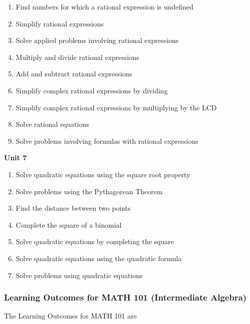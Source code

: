 \documentclass[10pt]{article}
\newenvironment{alphalist}{
\begin{enumerate}[label=(\arabic*),widest=107 ,leftmargin=25pt, itemsep=0pt]}
{\end{enumerate}}
\begin{document}
 \begin{alphalist}
    \item Find numbers for which a rational expression is undefined
    \item Simplify rational expressions
    \item Solve applied problems involving rational expressions
    \item Multiply and divide rational expressions
    \item Add and subtract rational expressions
    \item Simplify complex rational expressions by dividing
    \item Simplify complex rational expressions by multiplying by the LCD
    \item Solve rational equations
    \item Solve problems involving formulas with rational expressions
 \end{alphalist}
\noindent \textbf{Unit 7}
 \begin{alphalist}
    \item Solve quadratic equations using the square root property
    \item Solve problems using the Pythagorean Theorem
    \item Find the distance between two points
    \item Complete the square of a binomial
    \item Solve quadratic equations by completing the square
    \item Solve quadratic equations using the quadratic formula
    \item Solve problems using quadratic equations
 \end{alphalist}

\subsubsection*{Learning Outcomes for MATH 101 (Intermediate Algebra)}

The Learning Outcomes for MATH 101 are
\end{document}
